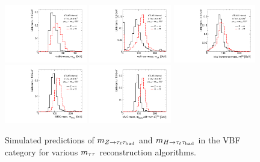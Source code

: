 \begin{figure}[tp]
  \centering
  \includegraphics[width=0.32\textwidth]{figures/mtautau/mtautau-vbf-mvis}
  \includegraphics[width=0.32\textwidth]{figures/mtautau/mtautau-vbf-mcol}
  \includegraphics[width=0.32\textwidth]{figures/mtautau/mtautau-vbf-mttot}
  \includegraphics[width=0.32\textwidth]{figures/mtautau/mtautau-vbf-mMMC}
  \includegraphics[width=0.32\textwidth]{figures/mtautau/mtautau-vbf-mMMC_Truth}
  \caption{Simulated predictions of $m_{Z\rightarrow\tau_\ell\tau_\text{had}}$ and $m_{H\rightarrow\tau_\ell\tau_\text{had}}$ in the VBF category for various $m_{\tau\tau}$ reconstruction algorithms.}
  \label{fig:mtautau-vbf}
\end{figure}

\clearpage



